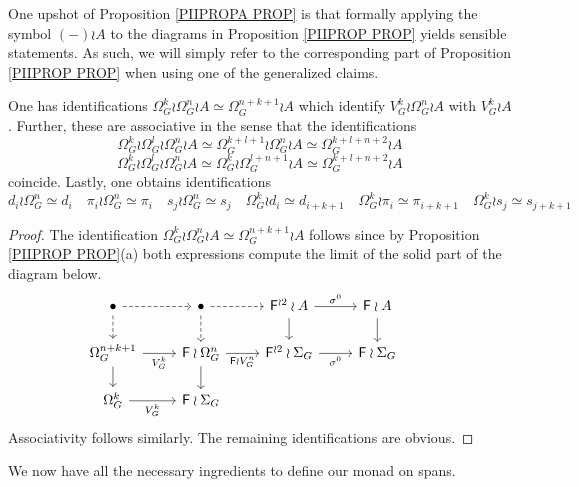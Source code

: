 \documentclass[a4paper,10pt]{article}%
\begin{document}
\begin{remark}
One upshot of Proposition \ref{PIIPROPA PROP} is that formally applying the symbol $(\minus) \wr A$ 
to the diagrams in Proposition \ref{PIIPROP PROP} yields sensible statements. As such, we will simply refer to the corresponding part of
Proposition \ref{PIIPROP PROP} when
using one of the generalized claims.
\end{remark}

\begin{corollary}\label{IDEN COR}
One has identifications 
$\Omega_G^k \wr \Omega_G^n \wr A \simeq \Omega_{G}^{n+k+1} \wr A$ which identify $V_G^k \wr \Omega_G^n \wr A$ with 
$V_G^k \wr A$.
Further, these are associative in the sense that the identifications
\[
	\Omega_G^k \wr \Omega_G^l \wr \Omega_G^n \wr A \simeq 
	\Omega_G^{k+l+1} \wr \Omega_G^n \wr A \simeq 
	\Omega_G^{k+l+n+2} \wr A 
\]
\[
	\Omega_G^k \wr \Omega_G^l \wr \Omega_G^n \wr A \simeq 
	\Omega_G^{k} \wr \Omega_G^{l+n+1} \wr A \simeq 
	\Omega_G^{k+l+n+2} \wr A 
\]
coincide.
Lastly, one obtains identifications
\[
	d_i \wr \Omega_G^n \simeq d_i \quad
	\pi_i \wr \Omega_G^n \simeq \pi_i \quad
	s_j \wr \Omega_G^n \simeq s_j \quad
	\Omega_G^k \wr d_i \simeq d_{i+k+1} \quad
	\Omega_G^k \wr \pi_i \simeq \pi_{i+k+1} \quad
	\Omega_G^k \wr s_j \simeq s_{j+k+1}
\]
\end{corollary}

\begin{proof}
The identification $\Omega_G^k \wr \Omega_G^n \wr A \simeq \Omega_{G}^{n+k+1} \wr A$ follows since by 
Proposition \ref{PIIPROP PROP}(a)
both expressions 
compute the limit of the solid part of the diagram below.
\[
\begin{tikzcd}[row sep = 1.5em]
	\bullet \ar[dashed]{r} \ar[dashed]{d}&
	\bullet \ar[dashed]{r} \ar[dashed]{d}&
	\Fin^{\wr 2} \wr A \ar{r}{\sigma^0} \ar{d}&
	\Fin \wr A \ar{d}
\\
	\Omega_G^{n+k+1} \ar{r}[swap]{V_G^k} \ar{d}&
	\Fin \wr \Omega^n_G \ar{r}[swap]{\Fin \wr V_G^n} \ar{d}&
	\Fin^{\wr 2} \wr \Sigma_G \ar{r}[swap]{\sigma^0} &
	\Fin \wr \Sigma_G &
\\
	\Omega_G^k \ar{r}[swap]{V_G^k} &
	\Fin \wr \Sigma_G
\end{tikzcd}
\]
Associativity follows similarly. The remaining identifications are obvious.
\end{proof}

We now have all the necessary ingredients to define our monad on 
spans.
\end{document}
